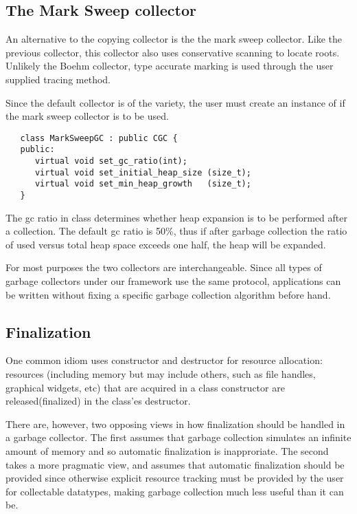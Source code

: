 \subsection{The Mark Sweep collector}

   An alternative to the copying collector is the the mark sweep collector.
Like the previous collector, this collector also uses conservative scanning 
to locate roots.  Unlikely the Boehm collector, type accurate marking
is used through the user supplied tracing method.

   Since the default collector is of the  variety, the user must
create an instance of  if the mark sweep collector
is to be used.  

\begin{verbatim}
   class MarkSweepGC : public CGC {
   public:
      virtual void set_gc_ratio(int);
      virtual void set_initial_heap_size (size_t);
      virtual void set_min_heap_growth   (size_t);
   }
\end{verbatim}

   The gc ratio in class  determines whether heap
expansion is to be performed after a collection.  The default gc ratio
is 50\%, thus if after garbage collection the ratio of used versus total
heap space exceeds one half, the heap will be expanded. 

   For most purposes the two collectors are interchangeable.  Since
all types of garbage collectors under our framework use the same protocol, 
applications can be written without fixing a specific garbage collection
algorithm before hand.  

\subsection{Finalization} 

   One common \Cpp{} idiom uses constructor and destructor for
resource allocation: resources (including memory but may include others,
such as file handles, graphical widgets, etc) that are acquired
in a class constructor are released(finalized) in the class'es destructor.

   There are, however, two opposing views in how finalization should be handled
in a garbage collector.  The first assumes that garbage collection
simulates an infinite amount of memory and so automatic finalization is
inapproriate.   The second takes a more pragmatic view, and assumes that
automatic finalization should be provided since otherwise explicit resource
tracking must be provided by the user for collectable datatypes, making garbage 
collection much less useful than it can be.

